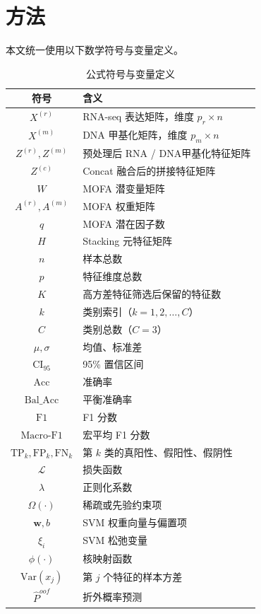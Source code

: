\section{方法}

本文统一使用以下数学符号与变量定义。

\begin{table}[H]
\centering
\caption{公式符号与变量定义}
\label{tab:symbols}
\begin{tabular}{cl}
\toprule
\textbf{符号} & \textbf{含义} \\
\midrule
$X^{(r)}$ & RNA-seq 表达矩阵，维度 $p_r \times n$ \\
$X^{(m)}$ & DNA 甲基化矩阵，维度 $p_m \times n$ \\
$Z^{(r)}, Z^{(m)}$ & 预处理后 RNA / DNA甲基化特征矩阵 \\
$Z^{(c)}$ & Concat 融合后的拼接特征矩阵 \\
$W$ & MOFA 潜变量矩阵 \\
$A^{(r)}, A^{(m)}$ & MOFA 权重矩阵 \\
$q$ & MOFA 潜在因子数 \\
$H$ & Stacking 元特征矩阵 \\
$n$ & 样本总数 \\
$p$ & 特征维度总数 \\
$K$ & 高方差特征筛选后保留的特征数 \\
$k$ & 类别索引（$k=1,2,\dots,C$） \\
$C$ & 类别总数（$C=3$） \\
$\mu, \sigma$ & 均值、标准差 \\
$\mathrm{CI}_{95}$ & 95\% 置信区间 \\
$\mathrm{Acc}$ & 准确率 \\
$\mathrm{Bal\_Acc}$ & 平衡准确率 \\
$\mathrm{F1}$ & F1 分数 \\
$\mathrm{Macro\text{-}F1}$ & 宏平均 F1 分数 \\
$\mathrm{TP}_k, \mathrm{FP}_k, \mathrm{FN}_k$ & 第 $k$ 类的真阳性、假阳性、假阴性 \\
$\mathcal{L}$ & 损失函数 \\
$\lambda$ & 正则化系数 \\
$\Omega(\cdot)$ & 稀疏或先验约束项 \\
$\mathbf{w}, b$ & SVM 权重向量与偏置项 \\
$\xi_i$ & SVM 松弛变量 \\
$\phi(\cdot)$ & 核映射函数 \\
$\mathrm{Var}(x_j)$ & 第 $j$ 个特征的样本方差 \\
$\hat{P}^{oof}$ & 折外概率预测 \\
\bottomrule
\end{tabular}
\end{table}

